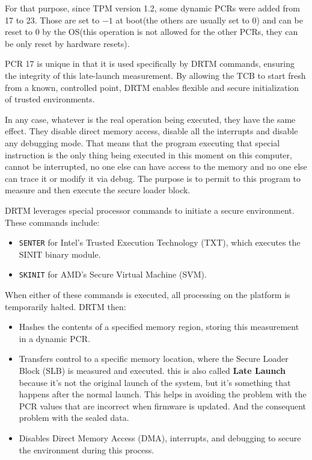 For that purpose, since TPM version 1.2, some dynamic PCRs were added
from 17 to 23. Those are set to $-1$ at boot(the others are usually
set to 0) and can be reset to $0$ by the OS(this operation is not
allowed for the other PCRs, they can be only reset by hardware resets).

PCR 17 is unique in that it is used specifically by DRTM commands,
ensuring the integrity of this late-launch measurement. By allowing
the TCB to start fresh from a known, controlled point, DRTM enables
flexible and secure initialization of trusted environments.

In any case, whatever is the real operation being executed, they have
the same effect. They disable direct memory access, disable all the
interrupts and disable any debugging mode. That means that the program
executing that special instruction is the only thing being executed in
this moment on this computer, cannot be interrupted, no one else can
have access to the memory and no one else can trace it or modify it
via debug. The purpose is to permit to this program to measure and
then execute the secure loader block.

DRTM leverages special processor commands to initiate a secure
environment. These commands include:
\begin{itemize}
    \item \texttt{SENTER} for Intel's Trusted Execution Technology
      (TXT), which executes the SINIT binary module.
    \item \texttt{SKINIT} for AMD's Secure Virtual Machine (SVM).
\end{itemize}

When either of these commands is executed, all processing on the
platform is temporarily halted. DRTM then:
\begin{itemize}
    \item Hashes the contents of a specified memory region, storing
      this measurement in a dynamic PCR.
    \item Transfers control to a specific memory location, where the
      Secure Loader Block (SLB) is measured and executed. this is also
      called \textbf{Late Launch} because it's not the original launch
      of the system, but it's something that happens after the normal
      launch. This helps in avoiding the problem with the PCR values
      that are incorrect when firmware is updated. And the consequent
      problem with the sealed data.
    \item Disables Direct Memory Access (DMA), interrupts, and
      debugging to secure the environment during this process.
\end{itemize}

